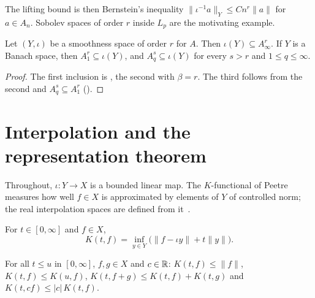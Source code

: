 The lifting bound is then Bernstein's inequality $\|\iota^{-1} a\|_Y \leq C n^r \|a\|$ for
$a \in A_n$. Sobolev spaces of order $r$ inside $L_p$ are the motivating example.

\begin{proposition}
\label{prop:smoothness}
\leanok
{}
Let $(Y, \iota)$ be a smoothness space of order $r$ for $A$. Then $\iota(Y) \subseteq
A^r_\infty$. If $Y$ is a Banach space, then $A^r_1 \subseteq \iota(Y)$, and
$A^s_q \subseteq \iota(Y)$ for every $s > r$ and $1 \leq q \leq \infty$.
\end{proposition}

\begin{proof}
\leanok
The first inclusion is , the second  with $\beta = r$.
The third follows from the second and $A^s_q \subseteq A^r_1$ ().
\end{proof}

\chapter{Interpolation and the representation theorem}
\label{ch:interpolation}

Throughout, $\iota : Y \to X$ is a bounded linear map. The $K$-functional of Peetre measures
how well $f \in X$ is approximated by elements of $Y$ of controlled norm; the real
interpolation spaces are defined from it~\cite{BerghLofstrom}.

\begin{definition}[$K$-functional]
\label{def:k-functional}
\leanok
For $t \in [0, \infty]$ and $f \in X$,
\[
  K(t, f) = \inf_{y \in Y} \bigl(\|f - \iota y\| + t \|y\|\bigr) .
\]
\end{definition}

\begin{lemma}
\label{lem:k-functional}
\leanok
{}
For all $t \leq u$ in $[0, \infty]$, $f, g \in X$ and $c \in \mathbb{R}$: $K(t, f) \leq \|f\|$,
$K(t, f) \leq K(u, f)$, $K(t, f + g) \leq K(t, f) + K(t, g)$ and
$K(t, c f) \leq |c| \, K(t, f)$.
\end{lemma}

